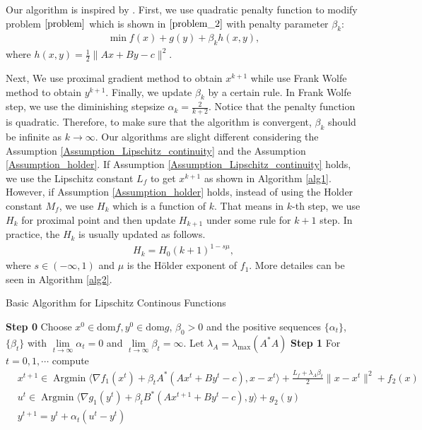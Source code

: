 \documentclass{article}
\numberwithin{equation}{section}
\def\Argmin{\mathop{\mathrm{Argmin}}}
\begin{document}
Our algorithm is inspired by \cite{yu2020rc}. First, we use quadratic 
penalty function to modify  problem $\eqref{problem}$ which is shown in $\eqref{problem_2}$ 
with penalty parameter $\beta_k$:
\begin{align}
    \min f(x) + g(y) + \beta_k h(x,y),  
    \label{problem_2}
\end{align}
where $h(x,y) = \frac{1}{2}\|Ax+ By-c \rVert^2$.

Next, We use proximal gradient method to obtain $x^{k+1}$ while use Frank
Wolfe method to obtain $y^{k+1}$. Finally, we update $\beta_k$ by a certain rule. In Frank Wolfe step, we use the diminishing 
stepsize $\alpha_k = \frac{2}{k+2}$. Notice that the penalty function 
is quadratic. Therefore, to make sure that the algorithm is convergent, $\beta_k$ should be infinite 
as $k\rightarrow \infty$. Our algorithms are slight different considering the Assumption \ref{Assumption_Lipschitz_continuity} 
and the Assumption \ref{Assumption_holder}. 
If Assumption \ref{Assumption_Lipschitz_continuity} holds, we use the Lipschitz constant $L_f$ to get $x^{k+1}$ 
as shown in Algorithm \ref{alg1}. However, if Assumption \ref{Assumption_holder} holds, instead of using the 
Holder constant $M_f$, we use $H_k$ which is a function of $k$. That means in $k$-th step, we use $H_k$ for 
proximal point and then update $H_{k+1}$ under some rule for $k+1$ step. In practice, the $H_{k}$ is usually 
updated as follows. 
\begin{align}
    H_{k} = H_0(k+1)^{1-s\mu} \label{definition_Ht}, 
\end{align} 
where $s \in (-\infty,1)$ and $\mu$ is the H\"older exponent of $f_1$. 
More detailes can be seen in Algorithm \ref{alg2}.

\begin{algorithm}
	\caption{Basic Algorithm for Lipschitz Continous Functions}
	\label{alg1}
	\begin{algorithmic}
		\STATE \textbf{Step 0} Choose $x^0 \in \mathrm{dom} f, y^0 \in \mathrm{dom} g$, $\beta_0>0$ and the positive sequences $\{\alpha_t\}$, $\{\beta_t\}$ 
        with $\lim\limits_{t\rightarrow\infty}\alpha_t=0$ and $\lim\limits_{t\rightarrow \infty}\beta_t=\infty $. 
        Let $\lambda_{A}=\lambda_{\max}(A^*A)$
		\STATE \textbf{Step 1} For $t=0,1,\cdots$ compute   
            \begin{align}
                &x^{t+1} \in \Argmin \langle \nabla f_1(x^t) + \beta_{t}A^*(Ax^t+By^t-c), x-x^t\rangle +\frac{L_f+\lambda_A \beta_t}{2}\|x-x^t\rVert^2 +f_2(x) \label{get_x_k} \\
                &u^t \in \Argmin \langle\nabla g_1(y^t) + \beta_{t}B^*(Ax^{t+1} +By^t-c),y\rangle +g_2(y) \label{get_uk}  \\
                &y^{t+1} = y^t +\alpha_t(u^t-y^t) \label{get_yk} 
            \end{align}
	\end{algorithmic}  
\end{algorithm}
\end{document}
